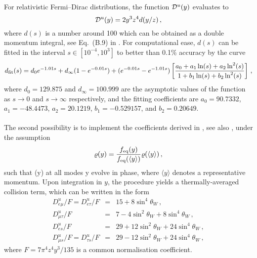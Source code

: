\documentclass[notitlepage,showpacs,preprintnumbers,amsmath,amssymb,superscriptaddress,prd,onecolumn]{revtex4-1}
\begin{document}
For relativistic Fermi--Dirac distributions, the function ${\cal D}^u(y)$ evaluates to
\begin{equation}
{\cal D}^u(y) = 2 y^3 z^4 d(y/z)\,,
\label{eq:dy}
\end{equation}
where $d(s)$ is a number around 100 which can be obtained as a double momentum integral,
see Eq.~(B.9) in \cite{Bennett:inprep}.
For computational ease,
$d(s)$ can be fitted in the interval $s \in [10^{-4},10^3]$ to better than 0.1\% accuracy by the curve
\begin{equation}
d_{\rm fit}(s)
=
d_0 e^{-1.01 s}
+
d_\infty (1- e^{-0.01 s})
+
(e^{-0.01 s}-e^{-1.01 s})
\left[
\frac{a_0 + a_1 \ln  (s) + a_2 \ln^2(s)}{1 + b_1 \ln  (s) + b_2 \ln^2(s)}
\right]\,,
\label{eq:fittingfunctiondy}
\end{equation}
where $d_0 = 129.875$ and $d_\infty = 100.999$ are the asymptotic values of the function as $s \to 0$ and
$s \to \infty$ respectively, and the fitting coefficients are
$a_0 = 90.7332$, $a_1 = -48.4473$, $a_2 =20.1219$,
$b_1 = -0.529157$, and $b_2 = 0.20649$.



\paragraph{}
The second possibility is to implement the coefficients derived in \cite{McKellar:1992ja},
see also \cite{Enqvist:1991qj,Bell:1998ds},
under the assumption
\begin{equation}
\varrho(y)
=
\frac{
f_{\rm eq}(y)
}{
f_{\rm eq}(\langle y\rangle)
}
\varrho(\langle y\rangle)\,,
\end{equation}
such that (y) at all modes y evolve in phase,
where $\langle y\rangle$ denotes a representative momentum.
Upon integration in $y$,
the procedure yields a thermally-averaged collision term,
which can be written in the form
%
\begin{eqnarray}
D^u_{e\mu}/F=D^u_{e\tau}/F & = & 15 + 8\sin^4\theta_W\,,\\
D^u_{\mu\tau}/F & = & 7 - 4\sin^2\theta_W + 8\sin^4\theta_W\,,\\
D^u_{es}/F & = & 29 + 12\sin^2\theta_W + 24\sin^4\theta_W\,,\\
D^u_{\mu s}/F = D^u_{\tau s}/F & = & 29 - 12\sin^2\theta_W + 24\sin^4\theta_W\,,
\end{eqnarray}
where
$F=7\pi^4 z^4 y^3/135$ is a common normalisation coefficient.
\end{document}
